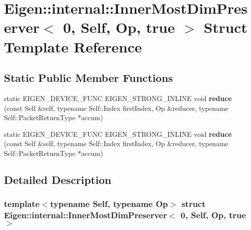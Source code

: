 \hypertarget{struct_eigen_1_1internal_1_1_inner_most_dim_preserver_3_010_00_01_self_00_01_op_00_01true_01_4}{}\section{Eigen\+:\+:internal\+:\+:Inner\+Most\+Dim\+Preserver$<$ 0, Self, Op, true $>$ Struct Template Reference}
\label{struct_eigen_1_1internal_1_1_inner_most_dim_preserver_3_010_00_01_self_00_01_op_00_01true_01_4}
\subsection*{Static Public Member Functions}
\begin{DoxyCompactItemize}
\item 
\mbox{\label{struct_eigen_1_1internal_1_1_inner_most_dim_preserver_3_010_00_01_self_00_01_op_00_01true_01_4_ac8fff6cb7edd3d1047592d20a6ce36c0}} 
static E\+I\+G\+E\+N\+\_\+\+D\+E\+V\+I\+C\+E\+\_\+\+F\+U\+NC E\+I\+G\+E\+N\+\_\+\+S\+T\+R\+O\+N\+G\+\_\+\+I\+N\+L\+I\+NE void {\bfseries reduce} (const Self \&self, typename Self\+::\+Index first\+Index, Op \&reducer, typename Self\+::\+Packet\+Return\+Type $\ast$accum)
\item 
\mbox{\label{struct_eigen_1_1internal_1_1_inner_most_dim_preserver_3_010_00_01_self_00_01_op_00_01true_01_4_ac8fff6cb7edd3d1047592d20a6ce36c0}} 
static E\+I\+G\+E\+N\+\_\+\+D\+E\+V\+I\+C\+E\+\_\+\+F\+U\+NC E\+I\+G\+E\+N\+\_\+\+S\+T\+R\+O\+N\+G\+\_\+\+I\+N\+L\+I\+NE void {\bfseries reduce} (const Self \&self, typename Self\+::\+Index first\+Index, Op \&reducer, typename Self\+::\+Packet\+Return\+Type $\ast$accum)
\end{DoxyCompactItemize}


\subsection{Detailed Description}
\subsubsection*{template$<$typename Self, typename Op$>$\newline
struct Eigen\+::internal\+::\+Inner\+Most\+Dim\+Preserver$<$ 0, Self, Op, true $>$}



